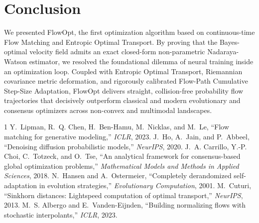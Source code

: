 \documentclass[10pt,journal,compsoc]{IEEEtran}
\begin{document}
\section{Conclusion}
We presented FlowOpt, the first optimization algorithm based on continuous-time Flow Matching and Entropic Optimal Transport. By proving that the Bayes-optimal velocity field admits an exact closed-form non-parametric Nadaraya-Watson estimator, we resolved the foundational dilemma of neural training inside an optimization loop. Coupled with Entropic Optimal Transport, Riemannian covariance metric deformation, and rigorously calibrated Flow-Path Cumulative Step-Size Adaptation, FlowOpt delivers straight, collision-free probability flow trajectories that decisively outperform classical and modern evolutionary and consensus optimizers across non-convex and multimodal landscapes.


\small
\setlength{\itemsep}{1pt plus 0.5pt}
\begin{thebibliography}{1}
Y.~Lipman, R.~Q. Chen, H.~Ben-Hamu, M.~Nicklas, and M.~Le, ``Flow matching for generative modeling,'' \emph{ICLR}, 2023.
J.~Ho, A.~Jain, and P.~Abbeel, ``Denoising diffusion probabilistic models,'' \emph{NeurIPS}, 2020.
J.~A. Carrillo, Y.-P. Choi, C.~Totzeck, and O.~Tse, ``An analytical framework for consensus-based global optimization problems,'' \emph{Mathematical Models and Methods in Applied Sciences}, 2018.
N.~Hansen and A.~Ostermeier, ``Completely derandomized self-adaptation in evolution strategies,'' \emph{Evolutionary Computation}, 2001.
M.~Cuturi, ``Sinkhorn distances: Lightspeed computation of optimal transport,'' \emph{NeurIPS}, 2013.
M.~S. Albergo and E.~Vanden-Eijnden, ``Building normalizing flows with stochastic interpolants,'' \emph{ICLR}, 2023.
\end{thebibliography}
\end{document}
